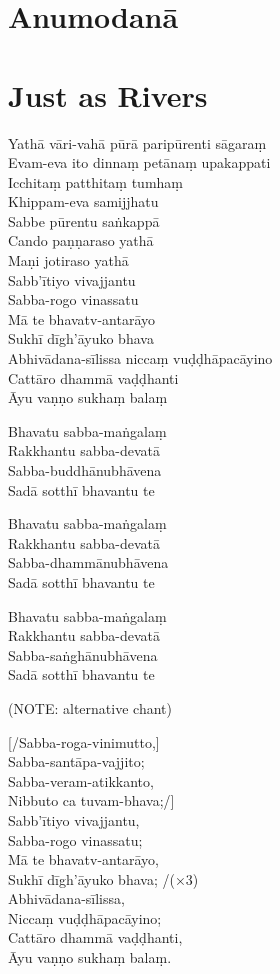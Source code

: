 \chapter{Anumodanā}

\chapter{Just as Rivers}

Yathā vāri-vahā pūrā paripūrenti sāgaraṃ\\
Evam-eva ito dinnaṃ petānaṃ upakappati\\
Icchitaṃ patthitaṃ tumhaṃ\\
Khippam-eva samijjhatu\\
Sabbe pūrentu saṅkappā\\
Cando paṇṇaraso yathā\\
Maṇi jotiraso yathā\\
Sabb'ītiyo vivajjantu\\
Sabba-rogo vinassatu\\
Mā te bhavatv-antarāyo\\
Sukhī dīgh'āyuko bhava\\
Abhivādana-sīlissa niccaṃ vuḍḍhāpacāyino\\
Cattāro dhammā vaḍḍhanti\\
Āyu vaṇṇo sukhaṃ balaṃ

Bhavatu sabba-maṅgalaṃ\\
Rakkhantu sabba-devatā\\
Sabba-buddhānubhāvena\\
Sadā sotthī bhavantu te

Bhavatu sabba-maṅgalaṃ\\
Rakkhantu sabba-devatā\\
Sabba-dhammānubhāvena\\
Sadā sotthī bhavantu te

Bhavatu sabba-maṅgalaṃ\\
Rakkhantu sabba-devatā\\
Sabba-saṅghānubhāvena\\
Sadā sotthī bhavantu te

(NOTE: alternative chant)

[/Sabba-roga-vinimutto,]\\
Sabba-santāpa-vajjito;\\
Sabba-veram-atikkanto,\\
Nibbuto ca tuvam-bhava;/]\\
Sabb'ītiyo vivajjantu,\\
Sabba-rogo vinassatu;\\
Mā te bhavatv-antarāyo,\\
Sukhī dīgh'āyuko bhava; /(×3)\\
Abhivādana-sīlissa,\\
Niccaṃ vuḍḍhāpacāyino;\\
Cattāro dhammā vaḍḍhanti,\\
Āyu vaṇṇo sukhaṃ balaṃ.

